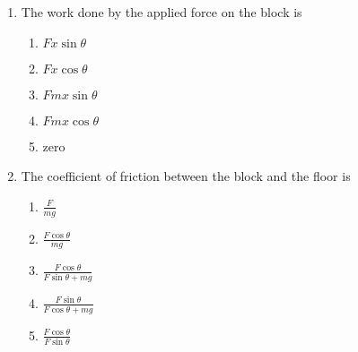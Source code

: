 \documentclass{../../../oss-classkick}
\begin{document}
\begin{multicols}{2}
\begin{center}
  \end{center}
  \begin{enumerate}[resume,leftmargin=18pt]
  \item The work done by the applied force on the block is
    \label{q:down1}
    \begin{enumerate}[nosep,leftmargin=18pt,label=(\Alph*)]
    \item $Fx\sin\theta$
    \item $Fx\cos\theta$
    \item $Fmx\sin\theta$
    \item $Fmx\cos\theta$
    \item zero
    \end{enumerate}
    
  \item The coefficient of friction between the block and the floor is
    \label{q:down2}
    \begin{enumerate}[nosep,leftmargin=18pt,label=(\Alph*)]
    \item $\displaystyle\frac{F}{mg}$
    \item $\displaystyle\frac{F\cos\theta}{mg}$
    \item $\displaystyle\frac{F\cos\theta}{F\sin\theta+mg}$
    \item $\displaystyle\frac{F\sin\theta}{F\cos\theta+mg}$
    \item $\displaystyle\frac{F\cos\theta}{F\sin\theta}$
    \end{enumerate}
  \end{enumerate}
  

\end{multicols}
\end{document}
